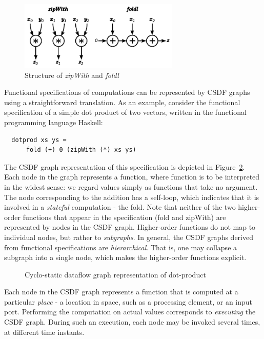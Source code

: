 \documentclass[journal]{IEEEtran}
\begin{document}
  \begin{figure}[h!]
    \centering
    \includegraphics[width=3in]{HOFs}
    \caption{Structure of \emph{zipWith} and \emph{foldl}}
    \label{fig:zipwthandfoldlstruct}
  \end{figure}

  Functional specifications of computations can be represented by CSDF graphs using a straightforward translation.
  As an example, consider the functional specification of a simple dot product of two vectors, written in the functional programming language Haskell:

\begin{verbatim}
  dotprod xs ys = 
      fold (+) 0 (zipWith (*) xs ys)  
\end{verbatim}


  The CSDF graph representation of this specification is depicted in Figure~\ref{fig:csdf-dotproduct}.
  Each node in the graph represents a function, where function is to be interpreted in the widest sense: we regard values simply as functions that take no argument.
  The node corresponding to the addition has a self-loop, which indicates that it is involved in a \emph{stateful} computation - the fold.
  Note that neither of the two higher-order functions that appear in the specification (fold and zipWith) are represented by nodes in the CSDF graph.
  Higher-order functions do not map to individual nodes, but rather to \emph{subgraphs}.
  In general, the CSDF graphs derived from functional specifications are \emph{hierarchical}.
  That is, one may collapse a subgraph into a single node, which makes the higher-order functions explicit.
  \begin{figure}[h!]
    \centering
    
    \caption{Cyclo-static dataflow graph representation of dot-product}
    \label{fig:csdf-dotproduct}
  \end{figure}

  Each node in the CSDF graph represents a function that is computed at a particular \emph{place} - a location in space, such as a processing element, or an input port.
  Performing the computation on actual values corresponds to \emph{executing} the CSDF graph.
  During such an execution, each node may be invoked several times, at different time instants.
\end{document}
